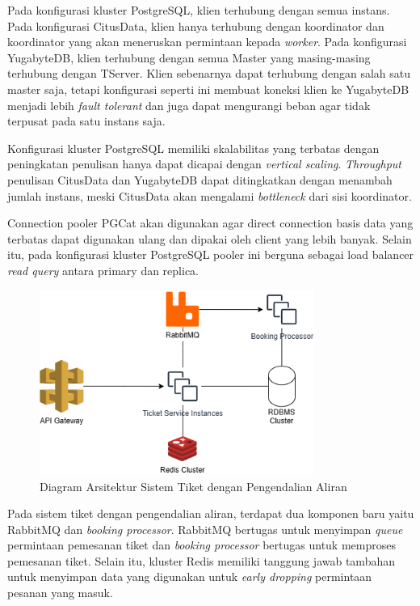 Pada konfigurasi kluster PostgreSQL, klien terhubung dengan semua instans. Pada konfigurasi CitusData, klien hanya terhubung dengan koordinator dan koordinator yang akan meneruskan permintaan kepada \textit{worker}. Pada konfigurasi YugabyteDB, klien terhubung dengan semua Master yang masing-masing terhubung dengan TServer. Klien sebenarnya dapat terhubung dengan salah satu master saja, tetapi konfigurasi seperti ini membuat koneksi klien ke YugabyteDB menjadi lebih \textit{fault tolerant} dan juga dapat mengurangi beban agar tidak terpusat pada satu instans saja.

Konfigurasi kluster PostgreSQL memiliki skalabilitas yang terbatas dengan peningkatan penulisan hanya dapat dicapai dengan \textit{vertical scaling}. \textit{Throughput} penulisan CitusData dan YugabyteDB dapat ditingkatkan dengan menambah jumlah instans, meski CitusData akan mengalami \textit{bottleneck} dari sisi koordinator.

Connection pooler PGCat akan digunakan agar direct connection basis data yang terbatas dapat digunakan ulang dan dipakai oleh client yang lebih banyak. Selain itu, pada konfigurasi kluster PostgreSQL pooler ini berguna sebagai load balancer \textit{read query} antara primary dan replica.

\begin{figure}[htbp]
    \centering
    \includegraphics[width=0.8\textwidth]{resources/chapter-3/ticket-fc.png}
    \caption{Diagram Arsitektur Sistem Tiket dengan Pengendalian Aliran}
    \label{fig:ticket-fc}
\end{figure}

Pada sistem tiket dengan pengendalian aliran, terdapat dua komponen baru yaitu RabbitMQ dan \textit{booking processor}. RabbitMQ bertugas untuk menyimpan \textit{queue} permintaan pemesanan tiket dan \textit{booking processor} bertugas untuk memproses pemesanan tiket. Selain itu, kluster Redis memiliki tanggung jawab tambahan untuk menyimpan data yang digunakan untuk \textit{early dropping} permintaan pesanan yang masuk.


